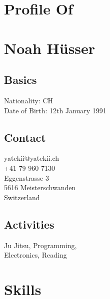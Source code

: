 \documentclass[]{deedy-resume-openfont}
\begin{document}
%
%

%
%

%
%
\noindent
\begin{minipage}[t]{0.33\textwidth}


\section{Profile Of}
\section{Noah Hüsser}
\sectionsep

\subsection{Basics}
Nationality: CH\\
Date of Birth: 12th January 1991
\sectionsep

\subsection{Contact}
yatekii@yatekii.ch\\
+41 79 960 7130\\
\sectionsep
Eggenstrasse 3\\
5616 Meisterschwanden\\
Switzerland
\sectionsep

\subsection{Activities}
Ju Jitsu, Programming,\\
Electronics, Reading
\sectionsep


\section{Skills}


\end{minipage}
\end{document}
